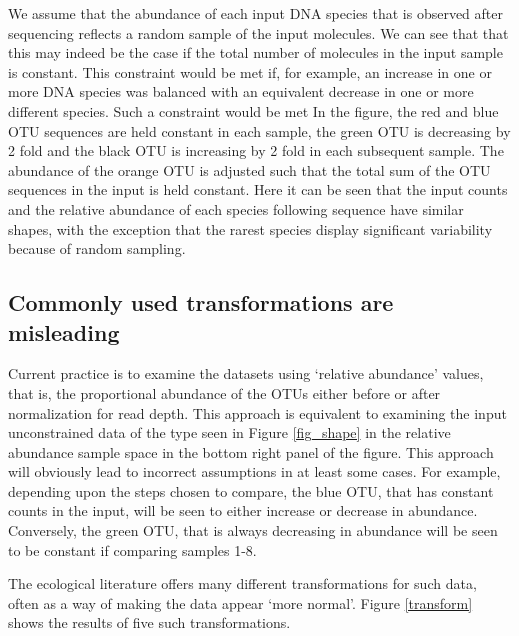 \documentclass[twocolumn]{article}
\begin{document}
We assume that the abundance of each input DNA species that is observed
after sequencing reflects a random sample of the input molecules. We can
see that that this may indeed be the case if the total number of
molecules in the input sample is constant. This constraint would be met
if, for example, an increase in one or more DNA species was balanced
with an equivalent decrease in one or more different species. Such a
constraint would be met In the figure, the red and blue OTU sequences
are held constant in each sample, the green OTU is decreasing by 2 fold
and the black OTU is increasing by 2 fold in each subsequent sample. The
abundance of the orange OTU is adjusted such that the total sum of the
OTU sequences in the input is held constant. Here it can be seen that
the input counts and the relative abundance of each species following
sequence have similar shapes, with the exception that the rarest species
display significant variability because of random sampling.

\subsection{Commonly used transformations are
misleading}\label{commonly-used-transformations-are-misleading}

Current practice is to examine the datasets using `relative abundance'
values, that is, the proportional abundance of the OTUs either before or
after normalization for read depth. This approach is equivalent to
examining the input unconstrained data of the type seen in Figure
\ref{fig_shape} in the relative abundance sample space in the bottom
right panel of the figure. This approach will obviously lead to
incorrect assumptions in at least some cases. For example, depending
upon the steps chosen to compare, the blue OTU, that has constant counts
in the input, will be seen to either increase or decrease in abundance.
Conversely, the green OTU, that is always decreasing in abundance will
be seen to be constant if comparing samples 1-8.

The ecological literature offers many different transformations for such
data, often as a way of making the data appear `more normal'. Figure
\ref{transform} shows the results of five such transformations.
\end{document}
